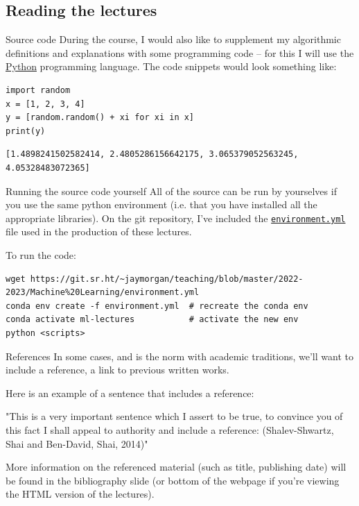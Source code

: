 \documentclass[10pt]{beamer}
\begin{document}
\subsection*{Reading the lectures}
\label{sec:org0322a80}

\begin{frame}[label={sec:org609a317},fragile]{Source code}
 During the course, I would also like to supplement my algorithmic definitions and
explanations with some programming code -- for this I will use the \href{https://www.python.org/}{Python} programming
language. The code snippets would look something like:

\begin{verbatim}
import random
x = [1, 2, 3, 4]
y = [random.random() + xi for xi in x]
print(y)
\end{verbatim}

\begin{verbatim}
[1.4898241502582414, 2.4805286156642175, 3.065379052563245, 4.05328483072365]
\end{verbatim}
\end{frame}

\begin{frame}[label={sec:org7907292},fragile]{Running the source code yourself}
 All of the source can be run by yourselves if you use the same python environment
(i.e. that you have installed all the appropriate libraries). On the git repository,
I've included the \href{https://git.sr.ht/\~jaymorgan/teaching/tree/master/item/2022-2023/Machine\%20Learning/environment.yml}{\texttt{environment.yml}} file used in the production of these lectures.

To run the code:

\begin{verbatim}
wget https://git.sr.ht/~jaymorgan/teaching/blob/master/2022-2023/Machine%20Learning/environment.yml
conda env create -f environment.yml  # recreate the conda env
conda activate ml-lectures           # activate the new env
python <scripts>
\end{verbatim}
\end{frame}

\begin{frame}[label={sec:org7f8819c}]{References}
In some cases, and is the norm with academic traditions, we'll want to include a
reference, a link to previous written works.

Here is an example of a sentence that includes a reference:

"This is a very important sentence which I assert to be true, to convince you of this
fact I shall appeal to authority and include a reference:
(Shalev-Shwartz, Shai and Ben-David, Shai, 2014)"

More information on the referenced material (such as title, publishing date) will be
found in the bibliography slide (or bottom of the webpage if you're viewing the HTML
version of the lectures).
\end{frame}
\end{document}
